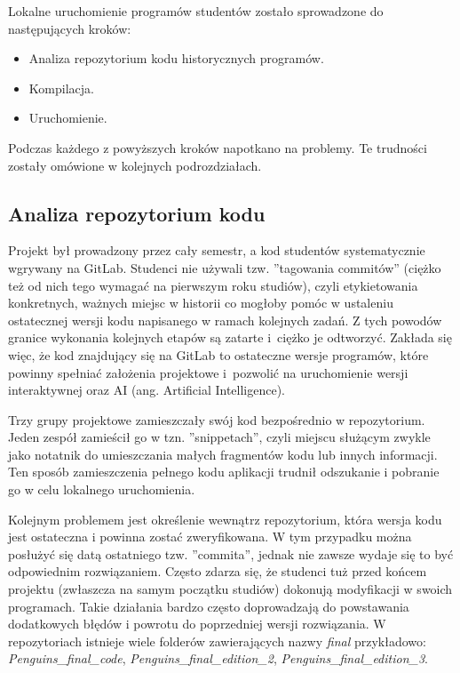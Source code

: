 Lokalne uruchomienie programów studentów zostało sprowadzone do następujących kroków:
\begin{itemize}
    \item Analiza repozytorium kodu historycznych programów.
    \item Kompilacja.
    \item Uruchomienie.
\end{itemize}

Podczas każdego z powyższych kroków napotkano na problemy.
Te trudności zostały omówione w kolejnych podrozdziałach.

\subsection{Analiza repozytorium kodu}

Projekt był prowadzony przez cały semestr, a kod studentów systematycznie wgrywany na GitLab.
Studenci nie używali tzw. ”tagowania commitów” (ciężko też od nich tego wymagać na pierwszym roku studiów), czyli etykietowania konkretnych, ważnych miejsc w historii co mogłoby pomóc w ustaleniu ostatecznej wersji kodu napisanego w ramach kolejnych zadań.
Z tych powodów granice wykonania kolejnych etapów są zatarte i~ciężko je odtworzyć.
Zakłada się więc, że kod znajdujący się na GitLab to ostateczne wersje programów, które powinny spełniać założenia projektowe i~pozwolić na uruchomienie wersji interaktywnej oraz AI (ang. Artificial Intelligence).

Trzy grupy projektowe zamieszczały swój kod bezpośrednio w repozytorium.
Jeden zespół zamieścił go w tzn. ”snippetach”, czyli miejscu służącym zwykle jako notatnik do umieszczania małych fragmentów kodu lub innych informacji.
Ten sposób zamieszczenia pełnego kodu aplikacji trudnił odszukanie i pobranie go w celu lokalnego uruchomienia.

Kolejnym problemem jest określenie wewnątrz repozytorium, która wersja kodu jest ostateczna i powinna zostać zweryfikowana.
W tym przypadku można posłużyć się datą ostatniego tzw. ”commita”, jednak nie zawsze wydaje się to być odpowiednim rozwiązaniem.
Często zdarza się, że studenci tuż przed końcem projektu (zwłaszcza na samym początku studiów) dokonują modyfikacji w swoich programach.
Takie działania bardzo często doprowadzają do powstawania dodatkowych błędów i powrotu do poprzedniej wersji rozwiązania.
W repozytoriach istnieje wiele folderów zawierających nazwy \textit{final} przykładowo: \textit{Penguins\_final\_code}, \textit{Penguins\_final\_edition\_2}, \textit{Penguins\_final\_edition\_3}.

